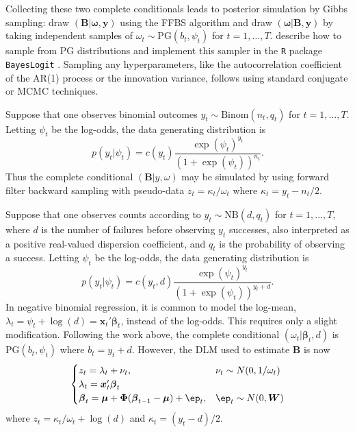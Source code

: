 \documentclass[12pt]{article}
\newcommand{\PG}{\text{PG}}
\newcommand{\NB}{\text{NB}}
\newcommand{\bbeta}{\boldsymbol{\beta}}
\newcommand{\oomega}{\boldsymbol{\omega}}
\newcommand{\yy}{\boldsymbol{y}}
\newcommand{\vx}{\boldsymbol{x}}
\newcommand{\betap}{{\boldsymbol{B}}}
\newcommand{\bW}{\boldsymbol{W}}
\newcommand{\bPhi}{\boldsymbol{\Phi}}
\newcommand{\bmu}{\boldsymbol{\mu}}
\newcommand{\vep}{\boldsymbol{\ep}}
\begin{document}
Collecting these two complete conditionals leads to posterior simulation by
Gibbs sampling: draw $(\betap|\oomega, \yy)$ using the FFBS algorithm and draw
$(\oomega | \betap, \yy)$ by taking independent samples of $\omega_t \sim
\PG(b_t, \psi_t)$ for $t=1, \ldots, T$.  \cite{polson-etal-2013} describe how to
sample from $\PG$ distributions and implement this sampler in the \texttt{R}
package \texttt{BayesLogit} \citep{bayeslogit-2013}.  Sampling any
hyperparameters, like the autocorrelation coefficient of the AR(1) process or
the innovation variance, follows using standard conjugate or MCMC techniques.

\begin{example}
  Suppose that one observes binomial outcomes $y_t \sim \text{Binom}(n_t, q_t)$
  for $t=1, \ldots, T$.  Letting $\psi_t$ be the log-odds, the data generating
  distribution is
  \[
  p(y_t | \psi_t) = c(y_t) \frac{\exp(\psi_t)^{y_t}}{(1+\exp({\psi_t}))^{n_t}}.
  \]
  Thus the complete conditional $(\betap | y, \omega)$ may be simulated by using
  forward filter backward sampling with pseudo-data $z_t = \kappa_t / \omega_t$
  where $\kappa_t = y_t - n_t / 2$.
\end{example}


\begin{example}
  Suppose that one observes counts according to $y_t \sim \NB(d, q_t)$ for
  $t=1, \ldots, T$, where $d$ is the number of failures before observing $y_t$
  successes, also interpreted as a positive real-valued dispersion coefficient,
  and $q_t$ is the probability of observing a success.  Letting $\psi_t$ be the
  log-odds, the data generating distribution is
  \[
  p(y_t | \psi_t) = c(y_t, d) \frac{\exp({\psi_t})^{y_t}}{(1+\exp({\psi_t}))^{y_t+d}}.
  \]
  In negative binomial regression, it is common to model the log-mean, $\lambda_t
  = \psi_t + \log(d) = \vx_t' \bbeta_t$, instead of the log-odds.  This requires only
  a slight modification.  Following the work above, the complete conditional
  $(\omega_t | \bbeta_t, d)$ is $\PG(b_t, \psi_t)$ where $b_t = y_t + d$.  However,
  the DLM used to estimate $\betap$ is now
  \[
  \begin{cases}
    z_t = \lambda_t + \nu_t, & \nu_t \sim N(0, 1/\omega_t) \\
    \lambda_t = \vx_t' \bbeta_t \\
    \bbeta_t = \bmu + \bPhi (\bbeta_{t-1} - \bmu) + \vep_t, & \vep_t \sim N(0, \bW)
  \end{cases}
  \]
  where $z_t = \kappa_t / \omega_t + \log(d)$ and $\kappa_t = (y_t - d) / 2$.
\end{example}
\end{document}
